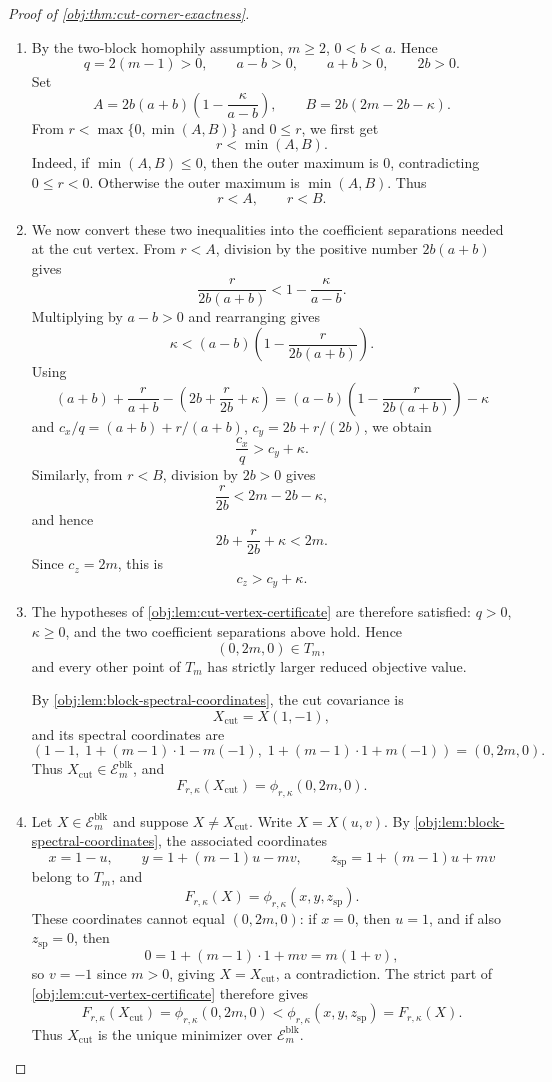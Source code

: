 \begin{proof}[Proof of \cref{obj:thm:cut-corner-exactness}]
\begin{enumerate}
\item
By the two-block homophily assumption, \(m\ge2\), \(0<b<a\). Hence
\[
q=2(m-1)>0,\qquad a-b>0,\qquad a+b>0,\qquad 2b>0 .
\]
Set
\[
A=2b(a+b)\left(1-\frac{\kappa}{a-b}\right),
\qquad
B=2b(2m-2b-\kappa).
\]
From \(r<\max\{0,\min(A,B)\}\) and \(0\le r\), we first get
\[
r<\min(A,B).
\]
Indeed, if \(\min(A,B)\le0\), then the outer maximum is \(0\), contradicting
\(0\le r<0\). Otherwise the outer maximum is \(\min(A,B)\). Thus
\[
r<A,\qquad r<B .
\]

\item
We now convert these two inequalities into the coefficient separations needed at the cut vertex.
From \(r<A\), division by the positive number \(2b(a+b)\) gives
\[
\frac{r}{2b(a+b)}
<
1-\frac{\kappa}{a-b}.
\]
Multiplying by \(a-b>0\) and rearranging gives
\[
\kappa
<
(a-b)\left(1-\frac{r}{2b(a+b)}\right).
\]
Using
\[
(a+b)+\frac{r}{a+b}
-\left(2b+\frac{r}{2b}+\kappa\right)
=
(a-b)\left(1-\frac{r}{2b(a+b)}\right)-\kappa
\]
and \(c_x/q=(a+b)+r/(a+b)\), \(c_y=2b+r/(2b)\), we obtain
\[
\frac{c_x}{q}>c_y+\kappa .
\]
Similarly, from \(r<B\), division by \(2b>0\) gives
\[
\frac{r}{2b}<2m-2b-\kappa,
\]
and hence
\[
2b+\frac{r}{2b}+\kappa<2m.
\]
Since \(c_z=2m\), this is
\[
c_z>c_y+\kappa .
\]

\item
The hypotheses of \cref{obj:lem:cut-vertex-certificate} are therefore satisfied: \(q>0\), \(\kappa\ge0\), and the two coefficient separations above hold. Hence
\[
(0,2m,0)\in T_m,
\]
and every other point of \(T_m\) has strictly larger reduced objective value.

By \cref{obj:lem:block-spectral-coordinates}, the cut covariance is
\[
X_{\mathrm{cut}}=X(1,-1),
\]
and its spectral coordinates are
\[
(1-1,\;1+(m-1)\cdot1-m(-1),\;1+(m-1)\cdot1+m(-1))
=(0,2m,0).
\]
Thus \(X_{\mathrm{cut}}\in\mathcal E_m^{\mathrm{blk}}\), and
\[
F_{r,\kappa}(X_{\mathrm{cut}})
=
\phi_{r,\kappa}(0,2m,0).
\]

\item
Let \(X\in\mathcal E_m^{\mathrm{blk}}\) and suppose \(X\ne X_{\mathrm{cut}}\). Write \(X=X(u,v)\). By \cref{obj:lem:block-spectral-coordinates}, the associated coordinates
\[
x=1-u,\qquad
y=1+(m-1)u-mv,\qquad
z_{\mathrm{sp}}=1+(m-1)u+mv
\]
belong to \(T_m\), and
\[
F_{r,\kappa}(X)=\phi_{r,\kappa}(x,y,z_{\mathrm{sp}}).
\]
These coordinates cannot equal \((0,2m,0)\): if \(x=0\), then \(u=1\), and if also
\(z_{\mathrm{sp}}=0\), then
\[
0=1+(m-1)\cdot1+mv=m(1+v),
\]
so \(v=-1\) since \(m>0\), giving \(X=X_{\mathrm{cut}}\), a contradiction. The strict part of \cref{obj:lem:cut-vertex-certificate} therefore gives
\[
F_{r,\kappa}(X_{\mathrm{cut}})
=
\phi_{r,\kappa}(0,2m,0)
<
\phi_{r,\kappa}(x,y,z_{\mathrm{sp}})
=
F_{r,\kappa}(X).
\]
Thus \(X_{\mathrm{cut}}\) is the unique minimizer over \(\mathcal E_m^{\mathrm{blk}}\).


\end{enumerate}
\end{proof}
